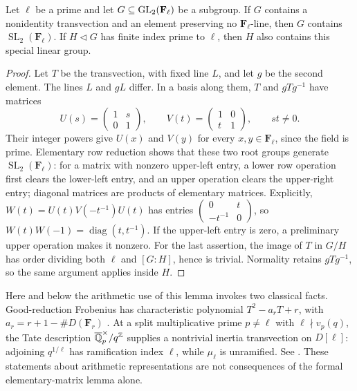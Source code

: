 \begin{lemma}
\label{lem:fr-sl2}
Let $\ell$ be a prime and let $G\subseteq\operatorname{GL}_2(\mathbf F_\ell)$
be a subgroup.
If $G$ contains a nonidentity transvection and an element preserving
no $\mathbf F_\ell$-line, then $G$ contains
$\operatorname{SL}_2(\mathbf F_\ell)$.
If $H\triangleleft G$ has finite index prime to $\ell$, then $H$
also contains this special linear group.
\end{lemma}
\begin{proof}
Let $T$ be the transvection, with fixed line $L$, and let $g$ be the
second element. The lines $L$ and $gL$ differ. In a basis along them,
$T$ and $gTg^{-1}$ have matrices
\[
 U(s)=\begin{pmatrix}1&s\\0&1\end{pmatrix},\qquad
 V(t)=\begin{pmatrix}1&0\\t&1\end{pmatrix},\qquad st\ne0.
\]
Their integer powers give $U(x)$ and $V(y)$ for every
$x,y\in\mathbf F_\ell$, since the field is prime. Elementary
row reduction shows that these two root groups generate
$\operatorname{SL}_2(\mathbf F_\ell)$: for a matrix with nonzero
upper-left entry, a lower row operation first clears the lower-left
entry, and an upper operation clears the upper-right entry; diagonal
matrices are products of elementary matrices. Explicitly,
$W(t)=U(t)V(-t^{-1})U(t)$ has entries
$\left(\begin{smallmatrix}0&t\\-t^{-1}&0\end{smallmatrix}\right)$,
so $W(t)W(-1)=\operatorname{diag}(t,t^{-1})$.
If the upper-left
entry is zero, a preliminary upper operation makes it nonzero.
For the last assertion, the image of $T$ in $G/H$ has order dividing
both $\ell$ and $[G:H]$, hence is trivial. Normality retains
$gTg^{-1}$, so the same argument applies inside $H$.
\end{proof}

Here and below the arithmetic use of this lemma invokes two classical
facts. Good-reduction Frobenius has characteristic polynomial
$T^2-a_rT+r$, with $a_r=r+1-\#D(\mathbf F_r)$
\cite[V.2; VII.4]{Silverman}. At a split multiplicative prime
$p\ne\ell$ with $\ell\nmid v_p(q)$, the Tate description
$\overline{\mathbb Q}_p^\times/q^\mathbb Z$ supplies a nontrivial inertia
transvection on $D[\ell]$: adjoining $q^{1/\ell}$ has ramification
index $\ell$, while $\mu_\ell$ is unramified. See
\cite[Theorems 1--2 and Proposition 3]{KedlayaTate}.
These statements about arithmetic representations are not consequences
of the formal elementary-matrix lemma alone.

